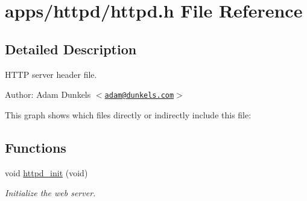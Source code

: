 \hypertarget{a00038}{
\section{apps/httpd/httpd.h File Reference}
\label{a00038}
}


\subsection{Detailed Description}
HTTP server header file. 

\begin{Desc}
\item[Author:]Adam Dunkels $<$\href{mailto:adam@dunkels.com}{\tt adam@dunkels.com}$>$ \end{Desc}




This graph shows which files directly or indirectly include this file:\subsection*{Functions}
\begin{CompactItemize}
\item 
void \hyperlink{a00082_gc364305cee969a0be43c071722b136e6}{httpd\_\-init} (void)
\begin{CompactList}\small\item\em Initialize the web server. \item\end{CompactList}\end{CompactItemize}
